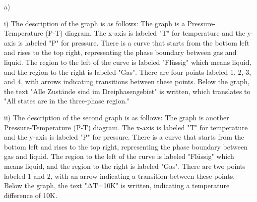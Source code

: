 a) 

i) The description of the graph is as follows: The graph is a Pressure-Temperature (P-T) diagram. The x-axis is labeled "T" for temperature and the y-axis is labeled "P" for pressure. There is a curve that starts from the bottom left and rises to the top right, representing the phase boundary between gas and liquid. The region to the left of the curve is labeled "Flüssig" which means liquid, and the region to the right is labeled "Gas". There are four points labeled 1, 2, 3, and 4, with arrows indicating transitions between these points. Below the graph, the text "Alle Zustände sind im Dreiphasengebiet" is written, which translates to "All states are in the three-phase region."

ii) The description of the second graph is as follows: The graph is another Pressure-Temperature (P-T) diagram. The x-axis is labeled "T" for temperature and the y-axis is labeled "P" for pressure. There is a curve that starts from the bottom left and rises to the top right, representing the phase boundary between gas and liquid. The region to the left of the curve is labeled "Flüssig" which means liquid, and the region to the right is labeled "Gas". There are two points labeled 1 and 2, with an arrow indicating a transition between these points. Below the graph, the text "ΔT=10K" is written, indicating a temperature difference of 10K.